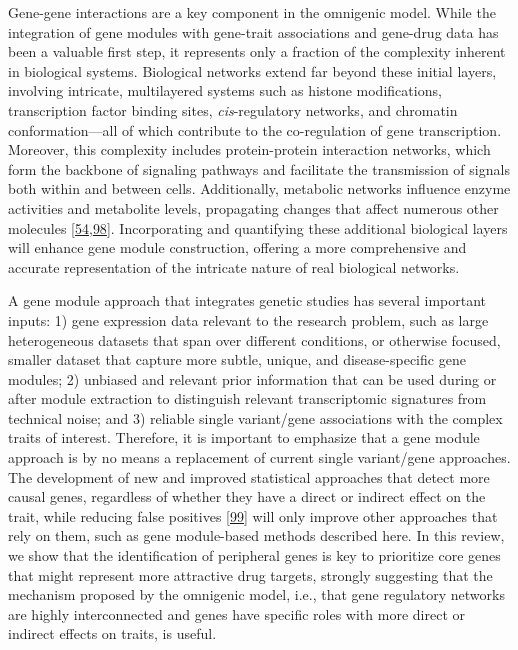 Gene-gene interactions are a key component in the omnigenic model.
While the integration of gene modules with gene-trait associations and gene-drug data has been a valuable first step, it represents only a fraction of the complexity inherent in biological systems.
Biological networks extend far beyond these initial layers, involving intricate, multilayered systems such as histone modifications, transcription factor binding sites, \emph{cis}-regulatory networks, and chromatin conformation---all of which contribute to the co-regulation of gene transcription.
Moreover, this complexity includes protein-protein interaction networks, which form the backbone of signaling pathways and facilitate the transmission of signals both within and between cells.
Additionally, metabolic networks influence enzyme activities and metabolite levels, propagating changes that affect numerous other molecules {[}\protect\hyperlink{ref-dg9nKuy0}{54},\protect\hyperlink{ref-KNAOTAKP}{98}{]}.
Incorporating and quantifying these additional biological layers will enhance gene module construction, offering a more comprehensive and accurate representation of the intricate nature of real biological networks.

A gene module approach that integrates genetic studies has several important inputs: 1) gene expression data relevant to the research problem, such as large heterogeneous datasets that span over different conditions, or otherwise focused, smaller dataset that capture more subtle, unique, and disease-specific gene modules; 2) unbiased and relevant prior information that can be used during or after module extraction to distinguish relevant transcriptomic signatures from technical noise; and 3) reliable single variant/gene associations with the complex traits of interest.
Therefore, it is important to emphasize that a gene module approach is by no means a replacement of current single variant/gene approaches.
The development of new and improved statistical approaches that detect more causal genes, regardless of whether they have a direct or indirect effect on the trait, while reducing false positives {[}\protect\hyperlink{ref-i8Qjy4pw}{99}{]} will only improve other approaches that rely on them, such as gene module-based methods described here.
In this review, we show that the identification of peripheral genes is key to prioritize core genes that might represent more attractive drug targets, strongly suggesting that the mechanism proposed by the omnigenic model, i.e., that gene regulatory networks are highly interconnected and genes have specific roles with more direct or indirect effects on traits, is useful.

